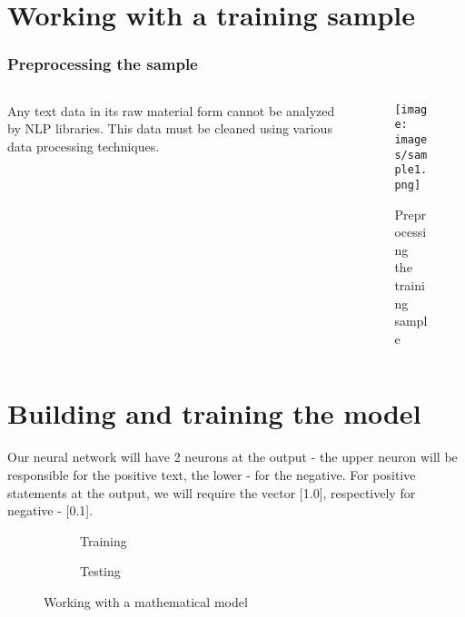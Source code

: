 \section{Working with a training sample}


\begin{frame}
\frametitle{Preprocessing the sample}
\begin{columns}
\begin{column}{0.4\textwidth}
Any text data in its raw material form cannot be analyzed by NLP libraries. This data must be cleaned using various data processing techniques.
\end{column}
\begin{column}{0.6\textwidth}
    \begin{figure}
    \centering
        \texttt{[image: images/sample1.png]}
        \caption{Preprocessing the training sample}
    \end{figure}
\end{column}
\end{columns}
\end{frame}


\section{Building and training the model}

\begin{frame}
Our neural network will have 2 neurons at the output - the upper neuron will be responsible for the positive text, the lower - for the negative. For positive statements at the output, we will require the vector [1.0], respectively for negative - [0.1].

\begin{figure}
\centering
    \begin{subfigure}
        \texttt{[image: images/pict7.png]}
        \caption{Training}
        \label{fig:nature1}
    \end{subfigure}
    \begin{subfigure}
        \texttt{[image: images/pict11.png]}
        \caption{Testing}
        \label{fig:nature2}
    \end{subfigure}
\caption{Working with a mathematical model}
\label{fig:images}
\end{figure}
\end{frame}


